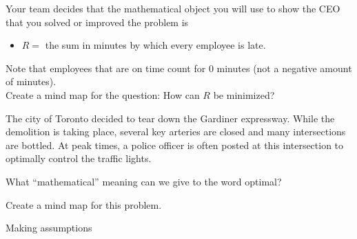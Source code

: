 Your team decides that the mathematical object you will use to show the CEO that you solved or improved the problem is
\begin{itemize}
	\item $R=$ the sum in minutes by which every employee is late.
\end{itemize}

Note that employees that are on time count for 0 minutes (not a negative amount of minutes). \\

Create a mind map for the question: \quad How can $R$ be minimized?


\bookonlynewpage


\question

The city of Toronto decided to tear down the Gardiner expressway. While the demolition is taking place, several key arteries are closed and many intersections are bottled. 
At peak times, a police officer is often posted at this intersection to optimally control the traffic lights. 

\begin{parts}
	\item What ``mathematical'' meaning can we give to the word optimal? 
	\item Create a mind map for this problem.
\end{parts}




	









\newpage


%
%



\begin{module}{Making assumptions}
	\label{assumption}

	
	
\end{module}




